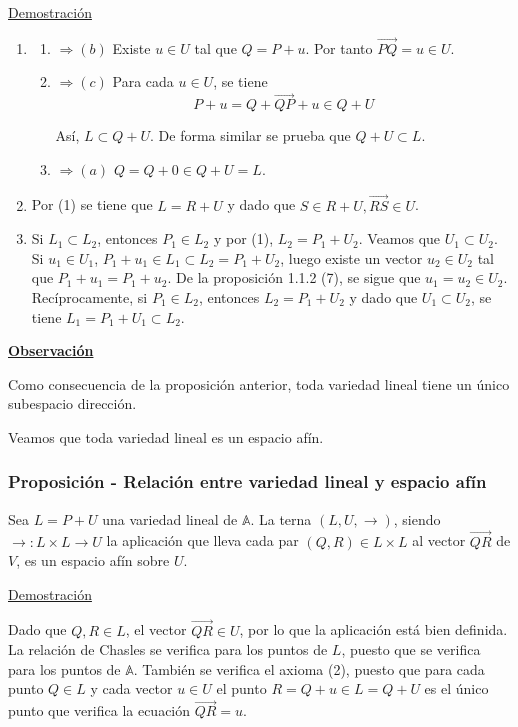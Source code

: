 \documentclass[12pt, a4paper, ones, notitlepage, openany,titlepage]{article}
\newcommand{\demostracion}{\noindent\underline{Demostración}}
\newcommand{\observacion}{\noindent\underline{\textbf{Observación}}}
\begin{document}
\demostracion
\begin{enumerate}[label=(\arabic*)]
\item 
\begin{enumerate}[label=(\alph*)]
	\item $\Rightarrow(b)$ Existe $u \in U$ tal que $Q=P+u$. Por tanto $\overrightarrow{P Q}=u \in U$.

	\item $ \Rightarrow(c)$ Para cada $u \in U$, se tiene
	$$
	P+u=Q+\overrightarrow{Q P}+u \in Q+U
	$$

	Así, $L \subset Q+U$. De forma similar se prueba que $Q+U \subset L$.

	\item $\Rightarrow(a)$ $Q=Q+0 \in Q+U=L$.
\end{enumerate}
\item Por (1) se tiene que $L=R+U$ y dado que $S \in R+U, \overrightarrow{R S} \in U$.

\item Si $L_{1} \subset L_{2}$, entonces $P_{1} \in L_{2}$ y por (1), $L_{2}=P_{1}+U_{2}$. Veamos que $U_{1} \subset U_{2}$. Si $u_{1} \in U_{1}$, $P_{1}+u_{1} \in L_{1} \subset L_{2}=P_{1}+U_{2}$, luego existe un vector $u_{2} \in U_{2}$ tal que $P_{1}+u_{1}=P_{1}+u_{2}$. De la proposición 1.1.2 (7), se sigue que $u_{1}=u_{2} \in U_{2}$. Recíprocamente, si $P_{1} \in L_{2}$, entonces $L_{2}=P_{1}+U_{2}$ y dado que $U_{1} \subset U_{2}$, se tiene $L_{1}=P_{1}+U_{1} \subset L_{2}$.
\end{enumerate}

\observacion

Como consecuencia de la proposición anterior, toda variedad lineal tiene un único subespacio dirección.

Veamos que toda variedad lineal es un espacio afín.

\subsubsection{Proposición - Relación entre variedad lineal y espacio afín}
Sea $L=P+U$ una variedad lineal de $\mathbb{A}$. La terna $(L, U, \rightarrow)$, siendo $\rightarrow: L \times L \longrightarrow U$ la aplicación que lleva cada par $(Q, R) \in L \times L$ al vector $\overrightarrow{Q R}$ de $V$, es un espacio afín sobre $U$.

\demostracion

Dado que $Q, R \in L$, el vector $\overrightarrow{Q R} \in U$, por lo que la aplicación está bien definida. La relación de Chasles se verifica para los puntos de $L$, puesto que se verifica para los puntos de $\mathbb{A}$. También se verifica el axioma (2), puesto que para cada punto $Q \in L$ y cada vector $u \in U$ el punto $R=Q+u \in L=Q+U$ es el único punto que verifica la ecuación $\overrightarrow{Q R}=u$.
\end{document}
